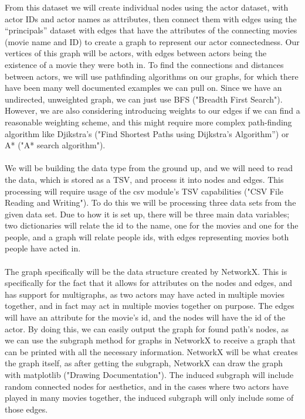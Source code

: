 \documentclass{article}
\begin{document}
From this dataset we will create individual nodes using the actor dataset, with actor IDs and actor names as attributes, then connect them with edges using the “principals” dataset with edges that have the attributes of the connecting movies (movie name and ID) to create a graph to represent our actor connectedness. Our vertices of this graph will be actors, with edges between actors being the existence of a movie they were both in. To find the connections and distances between actors, we will use pathfinding algorithms on our graphs, for which there have been many well documented examples we can pull on. Since we have an undirected, unweighted graph, we can just use BFS ("Breadth First Search"). However, we are also considering introducing weights to our edges if we can find a reasonable weighting scheme, and this might require more complex path-finding algorithm like Djikstra’s ("Find Shortest Paths using Dijkstra's Algorithm”) or A* ("A* search algorithm"). \\\\
We will be building the data type from the ground up, and we will need to read the data, which is stored as a TSV, and process it into nodes and edges. This processing will require usage of the csv module’s TSV capabilities ("CSV File Reading and Writing"). To do this we will be processing three data sets from the given data set. Due to how it is set up, there will be three main data variables; two dictionaries will relate the id to the name, one for the movies and one for the people, and a graph will relate people ids, with edges representing movies both people have acted in.\\\\
The graph specifically will be the data structure created by NetworkX. This is specifically for the fact that it allows for attributes on the nodes and edges, and has support for multigraphs, as two actors may have acted in multiple movies together, and in fact may act in multiple movies together on purpose. The edges will have an attribute for the movie’s id, and the nodes will have the id of the actor. By doing this, we can easily output the graph for found path’s nodes, as we can use the subgraph method for graphs in NetworkX to receive a graph that can be printed with all the necessary information. NetworkX will be what creates the graph itself, as after getting the subgraph, NetworkX can draw the graph with matplotlib ("Drawing Documentation"). The induced subgraph will include random connected nodes for aesthetics, and in the cases where two actors have played in many movies together, the induced subgraph will only include some of those edges. \\\\
\end{document}
